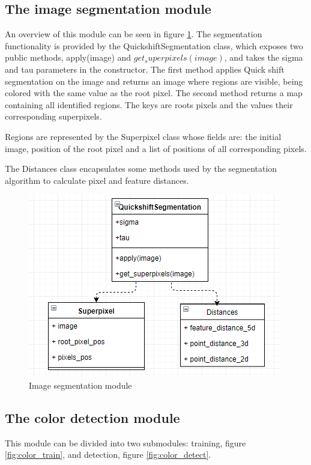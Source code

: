 \documentclass[12pt]{report}
\begin{document}
	\subsection{The image segmentation module}
	An overview of this module can be seen in figure \ref{fig:image_segmentation}. The segmentation functionality is provided by the QuickshiftSegmentation class, which exposes two public methods, apply(image) and $get_superpixels(image)$, and takes the sigma and tau parameters in the constructor. The first method applies Quick shift segmentation on the image and returns an image where regions are visible, being colored with the same value as the root pixel. The second method returns a map containing all identified regions. The keys are roots pixels and the values their corresponding superpixels. 
	
	Regions are represented by the Superpixel class whose fields are: the initial image, position of the root pixel and a list of positions of all corresponding pixels.
	
	The Distances class encapsulates some methods used by the segmentation algorithm to calculate pixel and feature distances.
	
	\begin{figure}[h!]
		\centering
		\includegraphics[]{design/image_segmentation.png}
		\caption{Image segmentation module}
		\label{fig:image_segmentation}
	\end{figure}

	\subsection{The color detection module}
	This module can be divided into two submodules: training, figure \ref{fig:color_train}, and detection, figure \ref{fig:color_detect}.
	
\end{document}
